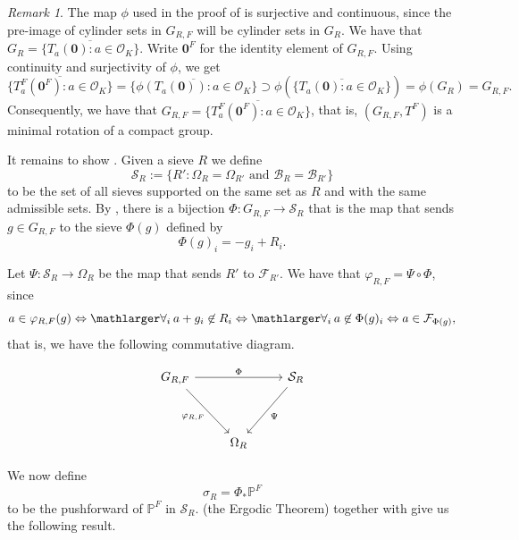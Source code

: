 \documentclass[a4paper,11pt,reqno]{amsart}
\theoremstyle{plain}
\theoremstyle{remark}
\newtheorem{remark}[theorem]{Remark}
\newcommand{\cb}{\mathcal{B}}
\newcommand{\co}{\mathcal{O}}
\newcommand{\cf}{\mathcal{F}}
\newcommand{\cs}{\mathcal{S}}
\newcommand{\frp}{\mathcal{F}_{R'}}
\newcommand{\grf}{G_{R,F}}
\newcommand{\vrf}{\varphi_{R,F}}
\newcommand{\mmp}{\mathbb{P}}
\begin{document}
			\begin{remark}
				\label{rmk: grf minimal rotation}
				The map $\phi$ used in the proof of   is surjective and continuous, since the pre-image of cylinder sets in $\grf$ will be cylinder sets in $G_R$. We have that $G_R= \overline{\{T_a(\textbf{0}):a \in \co_K\}}$. Write $\textbf{0}^F$ for the identity element of $\grf$. Using continuity and surjectivity of $\phi$, we get $$\overline{\{T^F_a(\textbf{0}^F):a \in \co_K\}} = \overline{\{\phi(T_a(\textbf{0})):a \in \co_K\}} \supset \phi\left(\overline{\{T_a(\textbf{0}):a \in \co_K\}}\right) = \phi(G_R) = \grf. $$ Consequently, we have that $\grf = \overline{\{T^F_a(\textbf{0}^F):a \in \co_K\}}$, that is, $(\grf, T^F)$ is a minimal rotation of a compact group.
			\end{remark}
			
			It remains to show . Given a sieve $R$ we define \begin{equation}
				\label{eq: CS_R}
				\cs_R := \{R': \Omega_R = \Omega_{R'} \text{ and } \cb_R = \cb_{R'}\}
			\end{equation} to be the set of all sieves supported on the same set as $R$ and with the same admissible sets.  By  , there is a bijection $\Phi:\grf \rightarrow \cs_R$ that is the map that sends $g \in \grf$ to the sieve $\Phi(g)$ defined by $$\Phi(g)_i = -g_i + R_i.$$ 
			
			Let $\Psi: \cs_R \rightarrow \Omega_{R}$ be the map that sends $R'$ to $\frp$. We have that $\vrf = \Psi \circ \Phi$, since $$a \in \vrf(g) \Leftrightarrow \mathlarger \forall_i \hspace{2pt} a+g_i \not \in R_i \Leftrightarrow \mathlarger \forall_i \hspace{2pt} a \not \in \Phi(g)_i \Leftrightarrow  a\in \cf_{\Phi(g)},$$ that is, we have the following commutative diagram.
			
			\[\begin{tikzcd}
				\grf && \cs_R \\
				\\
				& {\Omega_R}
				\arrow["\Phi", from=1-1, to=1-3]
				\arrow["\vrf"', from=1-1, to=3-2]
				\arrow["\Psi", from=1-3, to=3-2]
			\end{tikzcd}\]
			
			We now define \begin{equation}
				\label{def: sigmaR}
				\sigma_R = \Phi_*\mmp^F
			\end{equation}  to be the pushforward of $\mmp^F$ in $\cs_R$.   (the Ergodic Theorem) together with   give us the following result.
			
\end{document}
